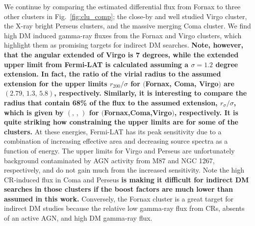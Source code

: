 \documentclass[10pt,aps,pra,reprint,amsmath,amsfonts,amssymb,showpacs,nofootinbib,floatfix]{revtex4-1}
\def\del#1{{}}
\def\C#1{{\bf #1}}
\newcommand{\rvir}{r_{200}}
\begin{document}
We continue by comparing the estimated differential flux from Fornax
to three other clusters in Fig.~\ref{fig:clu_comp}; the close-by and
well studied Virgo cluster, the X-ray bright Perseus clusters, and the
massive merging Coma cluster. We find high DM induced gamma-ray fluxes
from the Fornax and Virgo clusters, which highlight them as promising
targets for indirect DM searches. \C{Note, however, that the angular
  extended of Virgo is 7 degrees, while the extended upper limit from
  Fermi-LAT is calculated assuming a $\sigma=1.2$ degree extension. In
  fact, the ratio of the virial radius to the assumed extension for
  the upper limits $\rvir/\sigma$ for $($Fornax, Coma, Virgo$)$ are
  $(2.79,\,1.3,\,5.8)$, respectively. Similarly, it is interesting to
  compare the radius that contain 68\% of the flux to the assumed
  extension, $r_\sigma/\sigma$, which is given by $(,\,,\,)$ for
  $($Fornax,Coma,Virgo$)$, respectively. It is quite striking how
  constraining the upper limits are for some of the clusters.}
\del{Note, however, that we have used spatially unresolved upper
  limits, which is quite optimistic for the Virgo cluster which has an
  angular extended of 7 degrees.  It is quite striking how
  constraining the upper limits are for the Fornax cluster are
  compared to the other clusters, especially in the $1-10$~GeV energy
  regime.} At these energies, Fermi-LAT has its peak sensitivity due
to a combination of increasing effective area and decreasing source
spectra as a function of energy. The upper limits for Virgo and
Perseus are unfortunately background contaminated by AGN activity from
M87 and NGC 1267, respectively, and do not gain much from the
increased sensitivity. Note the high CR-induced flux in Coma and
Perseus \C{is making it difficult for indirect DM searches in
  those clusters if the boost factors are much lower than assumed in
  this work.} \del{is of the same magnitude as the DM flux from LP
  models, making it difficult for indirect DM searches in those
  clusters.} Conversely, the Fornax cluster is a great target for
indirect DM studies because the relative low gamma-ray flux from CRs,
absents of an active AGN, and high DM gamma-ray flux. \del{The
  Fermi-LAT three-year data will be able to constrain the smallest
  mass of substructures using the DM BM models.}
\end{document}
